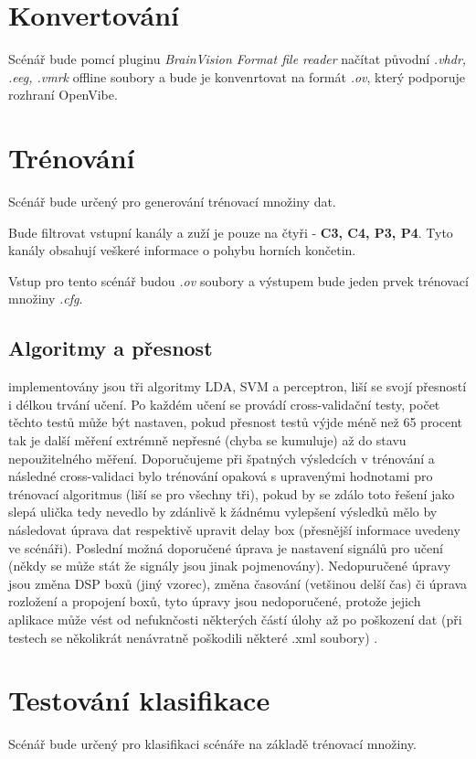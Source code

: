 \documentclass{report}
\begin{document}
\section{Konvertování}
%
Scénář bude pomcí pluginu \textit{BrainVision Format file reader} načítat původní  \textit{.vhdr, .eeg, .vmrk} offline soubory a bude je konvenrtovat na formát \textit{.ov}, který podporuje rozhraní OpenVibe.
%
\section{Trénování}
Scénář bude určený pro generování trénovací množiny dat.

Bude filtrovat vstupní kanály a zuží je pouze na čtyři - \textbf{C3, C4, P3, P4}. Tyto kanály obsahují veškeré informace o pohybu horních končetin.

Vstup pro tento scénář budou \textit{.ov} soubory a výstupem bude jeden prvek trénovací množiny \textit{.cfg}.
\subsection{Algoritmy a přesnost}
implementovány jsou tři algoritmy LDA, SVM a perceptron, liší se svojí přesností i délkou trvání učení. Po každém učení se provádí cross-validační testy, počet těchto testů může být nastaven, pokud 
přesnost testů výjde méně než 65 procent tak je další měření extrémně nepřesné (chyba se kumuluje) až do stavu nepoužitelného měření. Doporučujeme při špatných výsledcích v trénování a následné cross-validaci bylo trénování opaková s upravenými hodnotami pro trénovací algoritmus (liší se pro všechny tři), pokud by se zdálo toto řešení jako slepá ulička tedy nevedlo by zdánlivě k žádnému vylepšení výsledků mělo by následovat úprava dat respektivě upravit delay box (přesnější informace uvedeny ve scénáři). Poslední možná doporučené úprava je nastavení signálů pro učení (někdy se může stát že signály jsou jinak pojmenovány). Nedopuručené úpravy jsou změna DSP boxů (jiný vzorec), změna časování (vetšinou delší čas) či úprava rozložení a propojení boxů, tyto úpravy jsou nedoporučené, protože jejich aplikace může vést od nefuknčosti některých částí úlohy až po poškození dat (při testech se několikrát nenávratně poškodili některé .xml soubory)   . 

%
\section{Testování klasifikace}
Scénář bude určený pro klasifikaci scénáře na základě trénovací množiny.
\end{document}
